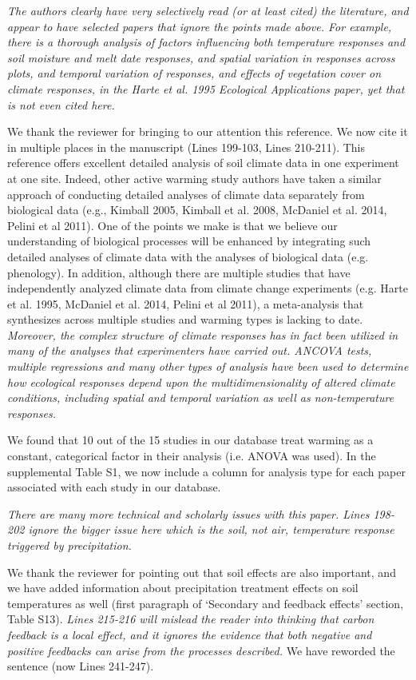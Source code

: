 \documentclass[11pt,a4paper]{letter}
\begin{document}
\emph{The authors clearly have very selectively read (or at least cited) the literature,  and appear to have selected papers that ignore the points made above.  For example, there is a  thorough analysis of factors influencing both temperature responses and soil moisture and melt date responses, and spatial variation in responses across plots,  and temporal variation of responses, and effects of vegetation cover on climate responses, in the Harte et al. 1995 Ecological Applications paper, yet that is not even cited here.}

We thank the reviewer for bringing to our attention this reference. We now cite it in multiple places in the manuscript (Lines 199-103, Lines 210-211). This reference offers excellent detailed analysis of soil climate data in one experiment at one site. Indeed, other active warming study authors have taken a similar approach of conducting detailed analyses of climate data separately from biological data (e.g., Kimball 2005, Kimball et al. 2008, McDaniel et al. 2014, Pelini et al 2011). One of the points we make is that we believe our understanding of biological processes will be enhanced by integrating such detailed analyses of climate data with the analyses of biological data (e.g. phenology). In addition, although there are multiple studies that have independently analyzed climate data from climate change experiments (e.g. Harte et al. 1995, McDaniel et al. 2014, Pelini et al 2011), a meta-analysis that synthesizes across multiple studies and warming types is lacking to date.\\

\emph{Moreover, the complex structure of climate responses has in fact been utilized in many of the analyses that experimenters have carried out.  ANCOVA tests, multiple regressions and many other types of analysis have been used to determine how ecological responses depend upon the multidimensionality of altered climate conditions, including spatial and temporal variation as well as non-temperature responses.}

We found that 10 out of the 15 studies in our database treat warming as a constant, categorical factor in their analysis (i.e. ANOVA was used). In the supplemental Table S1,   
we now include a column for analysis type for each paper associated with each study in our database. 
\par \emph{There are many more technical and scholarly issues with this paper.  Lines 198-202 ignore the bigger issue here which is the soil, not air, temperature response triggered by precipitation.}
\par We thank the reviewer for pointing out that soil effects are also important, and we have added information about precipitation treatment effects on soil temperatures as well (first paragraph of `Secondary and feedback effects' section, Table S13).
\emph  {Lines 215-216 will mislead the reader into thinking that carbon feedback is a local effect, and it ignores the evidence that both negative and positive feedbacks can arise from the processes described.}  
We have reworded the sentence (now Lines 241-247).
\end{document}
